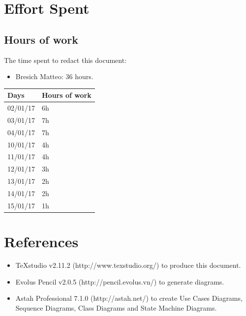 \documentclass{article}
\begin{document}
	\section{Effort Spent}
		\subsection{Hours of work} The time spent to redact this document:
		\begin{itemize}
			\item Bresich Matteo: 36 hours.
		\end{itemize}
		
		\begin{center}
			\begin{tabular}{ | l | l |}
				\hline
				Days & Hours of work\\ \hline
				02/01/17 & 6h\\\hline
				03/01/17 & 7h\\\hline
				04/01/17 & 7h\\\hline
				10/01/17 & 4h\\\hline
				11/01/17 & 4h\\\hline
				12/01/17 & 3h\\\hline
				13/01/17 & 2h\\\hline
				14/01/17 & 2h\\\hline
				15/01/17 & 1h\\\hline
				
			\end{tabular}
		\end{center}
	\section{References}
		\begin{itemize}
			\item TeXstudio v2.11.2 (http://www.texstudio.org/) to produce this document.
			\item Evolus Pencil v2.0.5 (http://pencil.evolus.vn/) to generate diagrams.
			\item Astah Professional 7.1.0 (http://astah.net/) to create Use Cases Diagrams, Sequence Diagrams, Class Diagrams and State Machine Diagrams.
		\end{itemize}
\end{document}
